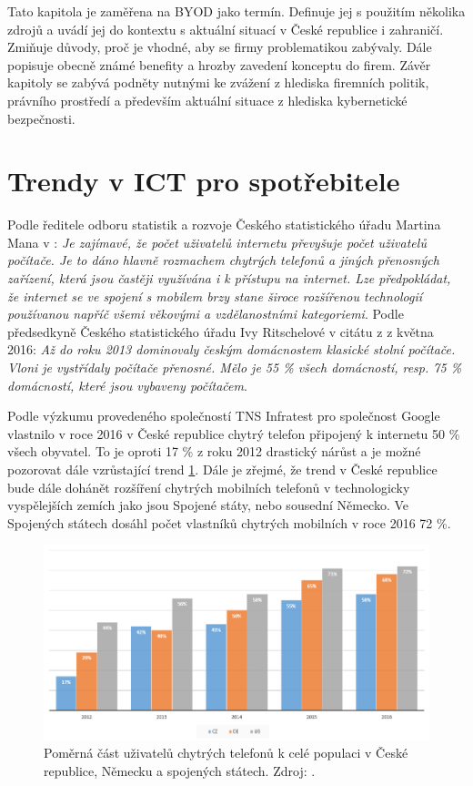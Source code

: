 Tato kapitola je zaměřena na BYOD jako termín. Definuje jej s použitím několika zdrojů a uvádí jej do kontextu s aktuální situací v České republice i zahraničí. Zmiňuje důvody, proč je vhodné, aby se firmy problematikou zabývaly. Dále popisuje obecně známé benefity a hrozby zavedení konceptu do firem. Závěr kapitoly se zabývá podněty nutnými ke zvážení z hlediska firemních politik, právního prostředí a především aktuální situace z hlediska kybernetické bezpečnosti.  

\section{Trendy v ICT pro spotřebitele}\label{trendy}

Podle ředitele odboru statistik a rozvoje Českého statistického úřadu Martina Mana v \cite{csu1}: \textit{Je zajímavé, že počet uživatelů internetu převyšuje počet uživatelů počítače. Je to dáno hlavně rozmachem chytrých telefonů a jiných přenosných zařízení, která jsou častěji využívána i k přístupu na internet. Lze předpokládat, že internet se ve spojení s mobilem brzy stane široce rozšířenou technologií používanou napříč všemi věkovými a vzdělanostními  kategoriemi}. Podle předsedkyně Českého statistického úřadu Ivy Ritschelové v citátu z \cite{csu1} z května 2016: \textit{Až do roku 2013 dominovaly českým domácnostem klasické stolní počítače. Vloni je vystřídaly počítače přenosné. Mělo je 55 \% všech domácností, resp. 75 \% domácností, které jsou vybaveny počítačem}.

Podle výzkumu provedeného společností TNS Infratest pro společnost Google \cite{barometer} vlastnilo v roce 2016 v České republice chytrý telefon připojený k internetu 50 \% všech obyvatel. To je oproti 17 \% z roku 2012 drastický nárůst a je možné pozorovat dále vzrůstající trend \ref{uzivateleSmartphone}. Dále je zřejmé, že trend v České republice bude dále dohánět rozšíření chytrých mobilních telefonů v technologicky vyspělejších zemích jako jsou Spojené státy, nebo sousední Německo. Ve Spojených státech dosáhl počet vlastníků chytrých mobilních v roce 2016 72 \%.

\begin{figure}[h!]\label{uzivateleSmartphone}
\centering
\includegraphics[width=13cm]{img/uzivateleSmartphone}
\caption{Poměrná část uživatelů chytrých telefonů k celé populaci v České republice, Německu a spojených státech. Zdroj: \cite{barometer}.} 
\end{figure}

